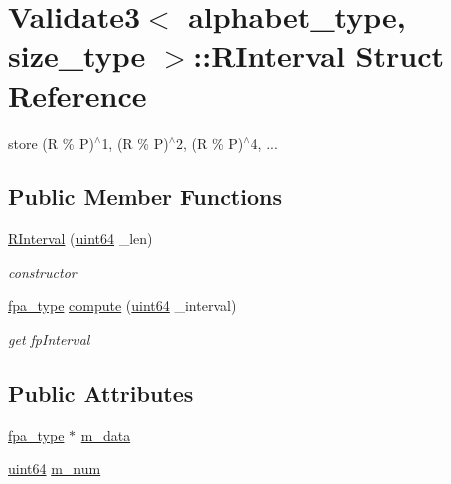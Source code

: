 \hypertarget{struct_validate3_1_1_r_interval}{}\section{Validate3$<$ alphabet\+\_\+type, size\+\_\+type $>$\+:\+:R\+Interval Struct Reference}
\label{struct_validate3_1_1_r_interval}


store (R \% P)$^\wedge$1, (R \% P)$^\wedge$2, (R \% P)$^\wedge$4, ...  


\subsection*{Public Member Functions}
\begin{DoxyCompactItemize}
\item 
\hyperlink{struct_validate3_1_1_r_interval_a6bed3e6ae2b969b4cc5f7466c95edba0}{R\+Interval} (\hyperlink{types_8h_a60e8696a4678cd348e991a1f172e53f7}{uint64} \+\_\+len)
\begin{DoxyCompactList}\small\item\em constructor \end{DoxyCompactList}\item 
\hyperlink{common_8h_a7fdaf8b9b3d2f6ae6b10597a8d3f96ee}{fpa\+\_\+type} \hyperlink{struct_validate3_1_1_r_interval_a7f5178d27e49d60e23e2a45635d2b076}{compute} (\hyperlink{types_8h_a60e8696a4678cd348e991a1f172e53f7}{uint64} \+\_\+interval)
\begin{DoxyCompactList}\small\item\em get fp\+Interval \end{DoxyCompactList}\end{DoxyCompactItemize}
\subsection*{Public Attributes}
\begin{DoxyCompactItemize}
\item 
\hyperlink{common_8h_a7fdaf8b9b3d2f6ae6b10597a8d3f96ee}{fpa\+\_\+type} $\ast$ \hyperlink{struct_validate3_1_1_r_interval_a137b07cbcfdf9b356285f8389bb9bc76}{m\+\_\+data}
\item 
\hyperlink{types_8h_a60e8696a4678cd348e991a1f172e53f7}{uint64} \hyperlink{struct_validate3_1_1_r_interval_a7d49d9eae5b1e584d29ca795472ea921}{m\+\_\+num}
\end{DoxyCompactItemize}


